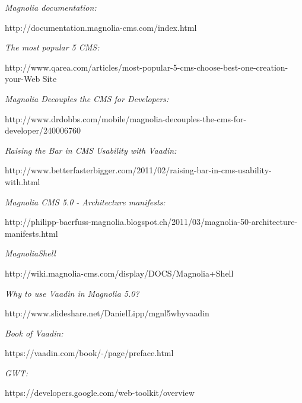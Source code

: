 \documentclass[pdftex,a4paper]{article}
\begin{document}
\fontsize{12pt}{14pt}
\selectfont

\tableofcontents \listoffigures




  
 










\begin{thebibliography}{9}

  \emph{Magnolia documentation:} 
  
  http://documentation.magnolia-cms.com/index.html

  \emph{The most popular 5 CMS:} 
  
  http://www.qarea.com/articles/most-popular-5-cms-choose-best-one-creation-your-Web Site

  \emph{Magnolia Decouples the CMS for Developers:} 
  
  http://www.drdobbs.com/mobile/magnolia-decouples-the-cms-for-developer/240006760  
 
  \emph{Raising the Bar in CMS Usability with Vaadin:} 
  
  http://www.betterfasterbigger.com/2011/02/raising-bar-in-cms-usability-with.html
  
  \emph{Magnolia CMS 5.0 - Architecture manifests:} 
  
  http://philipp-baerfuss-magnolia.blogspot.ch/2011/03/magnolia-50-architecture-manifests.html
  
  \emph{MagnoliaShell} 
  
  http://wiki.magnolia-cms.com/display/DOCS/Magnolia+Shell
 
  \emph{Why to use Vaadin in Magnolia 5.0?} 
   
  http://www.slideshare.net/DanielLipp/mgnl5whyvaadin
  
  \emph{Book of Vaadin:}
  
  https://vaadin.com/book/-/page/preface.html
  
  \emph{GWT:}
  
  https://developers.google.com/web-toolkit/overview
\end{thebibliography}
\end{document}
